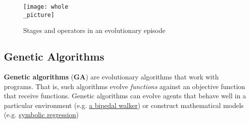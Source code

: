 \documentclass{article}
\begin{document}
\begin{figure}[h]
    \caption{Stages and operators in an evolutionary episode}
    \texttt{[image: whole\\\_picture]}    
    \centering
\end{figure}

\subsection{Genetic Algorithms}
\label{sec:genalg}
\textbf{Genetic algorithms} (\textbf{GA}) are evolutionary algorithms that work with programs. That is, such algorithms evolve \textit{functions} against an objective function that receive functions. Genetic algorithms can evolve agents that behave well in a particular environment (e.g. \href{https://www.mdpi.com/2227-7390/11/13/2931}{a bipedal walker}) or construct mathematical models (e.g. \href{https://link.springer.com/article/10.1007/s11831-023-09922-z}{symbolic regression})
\end{document}
